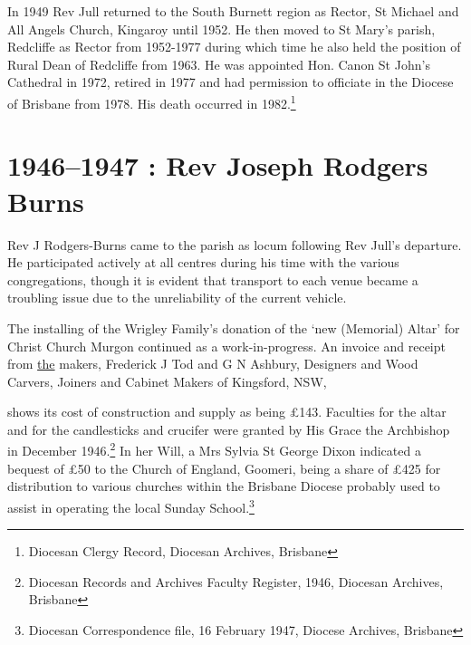 In 1949 Rev Jull returned to the South Burnett region as Rector, St Michael and All Angels Church, Kingaroy until 1952. He then moved to St Mary's parish, Redcliffe as Rector from 1952-1977 during which time he also held the position of Rural Dean of Redcliffe from 1963. He was appointed Hon. Canon St John's Cathedral in 1972, retired in 1977 and had permission to officiate in the Diocese of Brisbane from 1978. His death occurred in 1982.\footnote{Diocesan Clergy Record, Diocesan Archives, Brisbane}


\section{1946--1947 : Rev Joseph Rodgers Burns}



Rev J Rodgers-Burns came to the parish as locum following Rev Jull's departure. He participated actively at all centres during his time with the various congregations, though it is evident that transport to each venue became a troubling issue due to the unreliability of the current vehicle.



The installing of the Wrigley Family's donation of the `new (Memorial) Altar' for Christ Church Murgon continued as a work-in-progress. An invoice and receipt from \underline{the} makers, Frederick J Tod and G N Ashbury, Designers and Wood Carvers, Joiners and Cabinet Makers of Kingsford, NSW,



shows its cost of construction and supply as being \pounds143. Faculties for the altar and for the candlesticks and crucifer were granted by His Grace the Archbishop in December 1946.\footnote{Diocesan Records and Archives Faculty Register, 1946, Diocesan Archives, Brisbane} In her Will, a Mrs Sylvia St George Dixon indicated a bequest of \pounds50 to the Church of England, Goomeri, being a share of \pounds425 for distribution to various churches within the Brisbane Diocese probably used to assist in operating the local Sunday School.\footnote{Diocesan Correspondence file, 16 February 1947, Diocese Archives, Brisbane}








